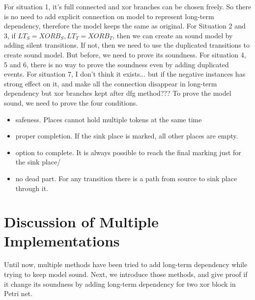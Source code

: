 For situation 1, it's full connected and xor branches can be chosen freely. So there is no need to add explicit connection on model to represent long-term dependency, therefore the model keeps the same as original. 
For Situation 2 and 3, if $LT_S = XORB_S, LT_T= XORB_T$, then we can create an sound model by adding silent transitions. If not, then we need to use the duplicated transitions to create sound model. But before, we need to prove its soundness. 
For situation 4, 5 and 6, there is no way to prove the soundness even by adding duplicated events. 
For situation 7, I don't think it exists... but if the negative instances has strong effect on it, and make all the connection disappear in long-term dependency but xor branches kept after dfg method??? 
To prove the model sound, we need to prove the four conditions.
\begin{itemize}
	\item safeness. Places cannot hold multiple tokens at the same time
	\item proper completion. If the sink place is marked, all other places are empty.
	\item option to complete. It is always possible to reach the final marking just for the sink place/
	\item no dead part. For any transition there is a path from source to sink place through it. 
\end{itemize}

\section{Discussion of Multiple Implementations}
Until now, multiple methods have been tried to add long-term dependency while trying to keep model sound. Next, we introduce those methods, and give proof if it change its soundness by adding long-term dependency for two xor block in Petri net. 
